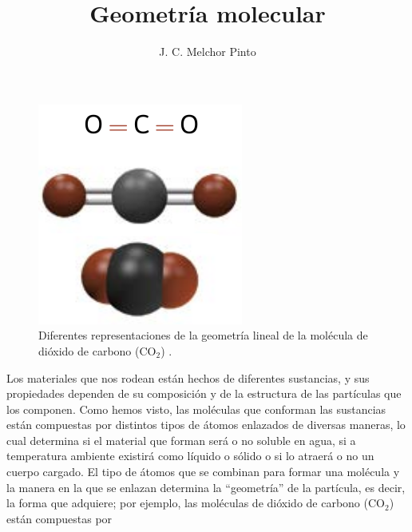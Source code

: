 \documentclass[12pt]{guia}
\title{Geometría molecular}
\author{J. C. Melchor Pinto}
\begin{document}
\pagestyle{headandfoot}
\addpoints
\INFO
\begin{opening}
    {
        \begin{minipage}{.2\textwidth}
            \begin{figure}[H]
                \centering
                \includegraphics[width=.9\linewidth]{../images/fig2.38.png}
                \caption{Diferentes representaciones de la geometría lineal de la molécula de dióxido de carbono (CO$_2$) .}
                \label{fig:2.38}
            \end{figure}
        \end{minipage}\hfill
        \begin{minipage}{.55\textwidth}
            Los materiales que nos rodean están hechos de diferentes sustancias, y sus propiedades dependen de su composición y de la estructura de las partículas que los
            componen. Como hemos visto, las moléculas que conforman las sustancias están
            compuestas por distintos tipos de átomos enlazados de diversas maneras, lo cual
            determina si el material que forman será o no soluble en agua, si a temperatura
            ambiente existirá como líquido o sólido o si lo atraerá o no un cuerpo cargado.
            El tipo de átomos que se combinan para formar una molécula y la manera en la
            que se enlazan determina la ``geometría'' de la partícula, es decir, la forma que adquiere; por ejemplo, las moléculas de dióxido de carbono (CO$_2$) están compuestas por

\end{minipage}}
\end{opening}
\end{document}
